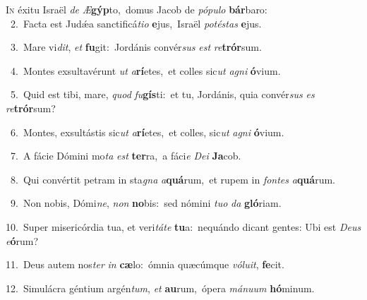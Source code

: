 \lettrine{\initial\textcolor{\initialcolor}{I}}{n} éxitu Israël \textit{de} \textit{Æ}\-\textbf{gýp}to,~\star domus Jacob de \textit{pó}\-\textit{pu}\textit{lo} \textbf{bár}\-baro:\\
{\numbfont\textcolor{\numbcolor}{~2.}}~Facta est Judǽa sanctificá\-\textit{ti}\-\textit{o} \textbf{e}\-jus,~\star Israël \textit{pot}\-\textit{és}\textit{tas} \textbf{e}\-jus.\par
{\numbfont\textcolor{\numbcolor}{~3.}}~Mare vi\-\textit{dit}\-, \textit{et} \textbf{fu}\-git:~\star Jordánis convér\textit{sus} \textit{est} \textit{re}\-\textbf{trór}sum.\par
{\numbfont\textcolor{\numbcolor}{~4.}}~Montes exsultavérunt \textit{ut} \textit{a}\-\textbf{rí}etes,~\star et colles sic\textit{ut} \textit{a}\-\textit{gni} \textbf{ó}\-vium.\par
{\numbfont\textcolor{\numbcolor}{~5.}}~Quid est tibi, mare, \textit{quod} \textit{fu}\-\textbf{gís}ti:~\star et tu, Jordánis, quia convér\textit{sus} \textit{es} \textit{re}\-\textbf{trór}sum?\par
{\numbfont\textcolor{\numbcolor}{~6.}}~Montes, exsultástis sic\textit{ut} \textit{a}\-\textbf{rí}etes,~\star et colles, sic\textit{ut} \textit{a}\-\textit{gni} \textbf{ó}\-vium.\par
{\numbfont\textcolor{\numbcolor}{~7.}}~A fácie Dómini mo\textit{ta} \textit{est} \textbf{ter}\-ra,~\star a fáci\textit{e} \textit{De}\-\textit{i} \textbf{Ja}\-cob.\par
{\numbfont\textcolor{\numbcolor}{~8.}}~Qui convértit petram in sta\textit{gna} \textit{a}\-\textbf{quá}rum,~\star et rupem in \textit{fon}\-\textit{tes} \textit{a}\-\textbf{quá}rum.\par
{\numbfont\textcolor{\numbcolor}{~9.}}~Non nobis, Dómi\-\textit{ne}\-, \textit{non} \textbf{no}\-bis:~\star sed nómini \textit{tu}\-\textit{o} \textit{da} \textbf{gló}\-riam.\par
{\numbfont\textcolor{\numbcolor}{10.}}~Super misericórdia tua, et veri\-\textit{tá}\-\textit{te} \textbf{tu}\-a:~\star nequándo dicant gentes: Ubi est \textit{De}\-\textit{us} \textit{e}\-\textbf{ó}rum?\par
{\numbfont\textcolor{\numbcolor}{11.}}~Deus autem nos\textit{ter} \textit{in} \textbf{cæ}\-lo:~\star ómnia quæcúmque \textit{vó}\-\textit{lu}\textit{it}, \textbf{fe}\-cit.\par
{\numbfont\textcolor{\numbcolor}{12.}}~Simulácra géntium argén\-\textit{tum}\-, \textit{et} \textbf{au}\-rum,~\star ópera \textit{má}\-\textit{nu}\textit{um} \textbf{hó}\-minum.\par
